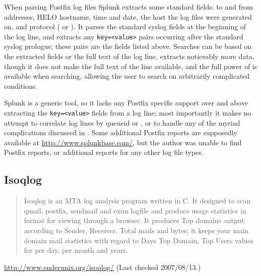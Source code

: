 When parsing Postfix log files Splunk extracts some standard fields: to and
from addresses, HELO hostname, time and date, the host the log files were
generated on, and protocol (\SMTP{} or \ESMTP{}).  It parses the standard
syslog fields at the beginning of the log line, and extracts any
\texttt{key=<value>} pairs occurring after the standard syslog prologue;
these pairs are the fields listed above.  Searches can be based on the
extracted fields or the full text of the log line.  \parsername{} extracts
noticeably more data, though it does not make the full text of the line
available, and the full power of \SQL{} is available when searching,
allowing the user to search on arbitrarily complicated conditions.

Splunk is a generic tool, so it lacks any Postfix specific support over and
above extracting the \texttt{key=<value>} fields from a log line; most
importantly it makes no attempt to correlate log lines by queueid or
\pid{}, or to handle any of the myriad complications discussed in
.  Some additional Postfix reports are supposedly
available at \url{http://www.splunkbase.com/}, but the author was unable to
find Postfix reports, or additional reports for any other log file types.

\newpage{}

\subsection{Isoqlog}

\begin{quotation}

    Isoqlog is an MTA log analysis program written in C. It designed to
    scan qmail, postfix, sendmail and exim logfile and produce usage
    statistics in \HTML{} format for viewing through a browser. It produces
    Top domains output according to Sender, Receiver, Total mails and
    bytes; it keeps your main domain mail statistics with regard to Days
    Top Domain, Top Users values for per day, per month and years.

\end{quotation}

\noindent{}\url{http://www.enderunix.org/isoqlog/} \newline{}
(Last checked 2007/08/13.)

